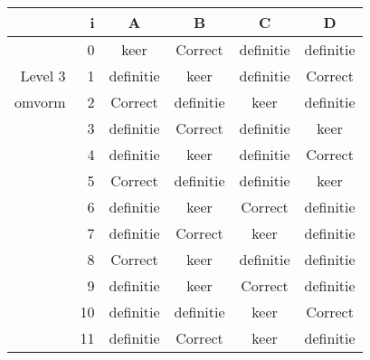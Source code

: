 \begin{tabular}{ rr| c|c|c|c}\hline\hline
     & i & \textbf{A} & \textbf{B} & \textbf{C} & \textbf{D}\\\hline

&0&keer&Correct\cellcolor[gray]{0.6}&definitie&definitie\\
Level 3 & 1&definitie&keer&definitie&Correct\cellcolor[gray]{0.6}\\
omvorm &2&Correct\cellcolor[gray]{0.6}&definitie&keer&definitie\\
&3&definitie&Correct\cellcolor[gray]{0.6}&definitie&keer\\
&4&definitie&keer&definitie&Correct\cellcolor[gray]{0.6}\\
&5&Correct\cellcolor[gray]{0.6}&definitie&definitie&keer\\
&6&definitie&keer&Correct\cellcolor[gray]{0.6}&definitie\\
&7&definitie&Correct\cellcolor[gray]{0.6}&keer&definitie\\
&8&Correct\cellcolor[gray]{0.6}&keer&definitie&definitie\\
&9&definitie&keer&Correct\cellcolor[gray]{0.6}&definitie\\
&10&definitie&definitie&keer&Correct\cellcolor[gray]{0.6}\\
&11&definitie&Correct\cellcolor[gray]{0.6}&keer&definitie\\
\hline\end{tabular}\par\ \newline

